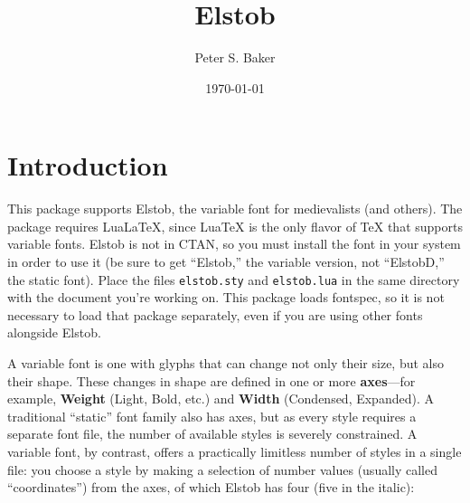 \documentclass[12pt]{article}
\title{Elstob}
\author{Peter S. Baker}
\date{\today}
\newcommand{\ltech}{Lua\kern-1.5pt\TeX}
\newcommand{\lltech}{Lua\LaTeX}
\newcommand{\fspec}{{\sffamily fontspec}}
\newcommand{\src}[1]{{\color{BrickRed}\texttt{#1}}}
\begin{document}
\maketitle

\section{Introduction}

This package supports Elstob, the variable font for medievalists (and others).
The package requires \lltech, since {\ltech} is
the only flavor of {\TeX} that supports variable fonts. Elstob is not in CTAN, so you must
install the font in your system in order to use it (be sure to get “Elstob,” the variable
version, not “ElstobD,” the static font). Place the files \src{elstob.sty} and
\src{elstob.lua} in the same
directory with the document you're working on. This package loads
\fspec, so it is not necessary to load that package separately, even if you are using
other fonts alongside Elstob.

A variable font is one with glyphs that can change not only their size, but also their
shape. These changes in shape are defined in one or more \textbf{axes}---for example,
\textbf{Weight} (Light, Bold, etc.) and \textbf{Width} (Condensed, Expanded). A traditional
“static” font family also has axes, but as every style requires a separate font file,
the number of available styles is severely constrained. A variable font, by contrast,
offers a practically limitless number of styles in a single file: you choose a style
by making a selection of number values (usually called “coordinates”) from the axes, 
of which Elstob has four (five in the italic):
\end{document}
